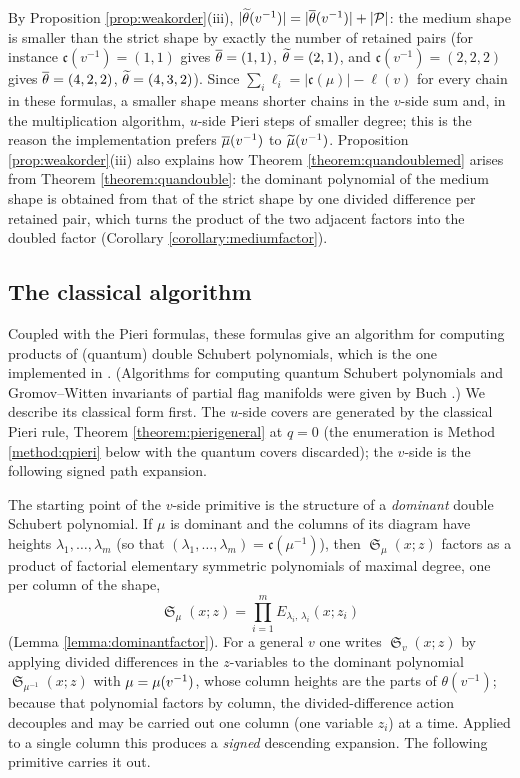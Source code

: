 \documentclass{amsart}
\theoremstyle{definition}
\theoremstyle{remark}
\numberwithin{equation}{section}
\DeclareMathOperator{\sch}{\mathfrak{S}}
\newcommand{\code}{\mathfrak{c}}
\begin{document}
By Proposition \ref{prop:weakorder}(iii), $|\widetilde{\theta}(v^{-1})|=|\overline{\theta}(v^{-1})|+|\mathcal P|$: the medium shape is smaller than the strict shape by exactly the number of retained pairs (for instance $\code(v^{-1})=(1,1)$ gives $\overline{\theta}=(1,1)$, $\widetilde{\theta}=(2,1)$, and $\code(v^{-1})=(2,2,2)$ gives $\overline{\theta}=(4,2,2)$, $\widetilde{\theta}=(4,3,2)$). Since $\sum_i\ell_i=|\code(\mu)|-\ell(v)$ for every chain in these formulas, a smaller shape means shorter chains in the $v$-side sum and, in the multiplication algorithm, $u$-side Pieri steps of smaller degree; this is the reason the implementation prefers $\overline{\mu}(v^{-1})$ to $\widetilde{\mu}(v^{-1})$. Proposition \ref{prop:weakorder}(iii) also explains how Theorem \ref{theorem:quandoublemed} arises from Theorem \ref{theorem:quandouble}: the dominant polynomial of the medium shape is obtained from that of the strict shape by one divided difference per retained pair, which turns the product of the two adjacent factors into the doubled factor (Corollary \ref{corollary:mediumfactor}).

\subsection{The classical algorithm}

Coupled with the Pieri formulas, these formulas give an algorithm for computing products of (quantum) double Schubert polynomials, which is the one implemented in \cite{schubmult}. (Algorithms for computing quantum Schubert polynomials and Gromov--Witten invariants of partial flag manifolds were given by Buch \cite{buch2005partial}.) We describe its classical form first. The $u$-side covers are generated by the classical Pieri rule, Theorem \ref{theorem:pierigeneral} at $q=0$ (the enumeration is Method \ref{method:qpieri} below with the quantum covers discarded); the $v$-side is the following signed path expansion.

The starting point of the $v$-side primitive is the structure of a \emph{dominant} double Schubert polynomial. If $\mu$ is dominant and the columns of its diagram have heights $\lambda_1,\ldots,\lambda_m$ (so that $(\lambda_1,\ldots,\lambda_m)=\code(\mu^{-1})$), then $\sch_\mu(x;z)$ factors as a product of factorial elementary symmetric polynomials of maximal degree, one per column of the shape,
$$\sch_\mu(x;z)=\prod_{i=1}^{m}E_{\lambda_i,\,\lambda_i}(x;z_i)$$
(Lemma \ref{lemma:dominantfactor}). For a general $v$ one writes $\sch_v(x;z)$ by applying divided differences in the $z$-variables to the dominant polynomial $\sch_{\mu^{-1}}(x;z)$ with $\mu=\mu(v^{-1})$, whose column heights are the parts of $\theta(v^{-1})$; because that polynomial factors by column, the divided-difference action decouples and may be carried out one column (one variable $z_i$) at a time. Applied to a single column this produces a \emph{signed} descending expansion. The following primitive carries it out.
\end{document}
